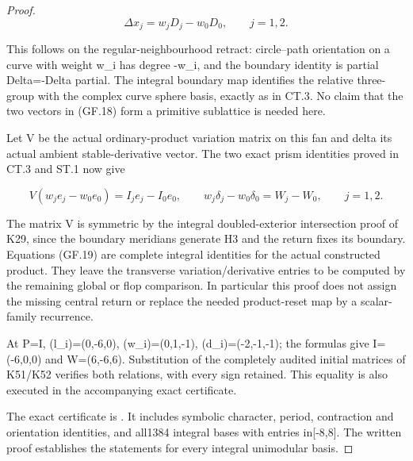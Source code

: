\begin{proof}
\[
 \Delta x_j=w_jD_j-w_0D_0,\qquad j=1,2.               \tag{GF.18}
\]

This follows on the regular-neighbourhood retract: circle--path
orientation on a curve with weight w\_i has degree -w\_i, and
the boundary identity is partial Delta=-Delta partial. The
integral boundary map identifies the relative three-group with
the complex curve sphere basis, exactly as in CT.3. No claim
that the two vectors in (GF.18) form a primitive sublattice is
needed here.

Let V be the actual ordinary-product variation matrix on this
fan and delta its actual ambient stable-derivative vector. The
two exact prism identities proved in CT.3 and ST.1 now give

\[
 V(w_je_j-w_0e_0)=I_je_j-I_0e_0,\qquad
 w_j\delta_j-w_0\delta_0=W_j-W_0,\qquad j=1,2.        \tag{GF.19}
\]

The matrix V is symmetric by the integral doubled-exterior
intersection proof of K29, since the boundary meridians generate
H3 and the return fixes its boundary. Equations (GF.19) are
complete integral identities for the actual constructed product.
They leave the transverse variation/derivative entries to be
computed by the remaining global or flop comparison. In particular
this proof does not assign the missing central return or replace
the needed product-reset map by a scalar-family recurrence.

At P=I, (l\_i)=(0,-6,0), (w\_i)=(0,1,-1),
(d\_i)=(-2,-1,-1); the formulas give I=(-6,0,0) and W=(6,-6,6).
Substitution of the completely audited initial matrices of K51/K52
verifies both relations, with every sign retained. This equality
is also executed in the accompanying exact certificate.

The exact certificate is . It includes symbolic character, period, contraction and orientation identities, and all1384 integral bases with entries in{[}-8,8{]}. The written proof establishes the statements for every integral unimodular basis.
\end{proof}

